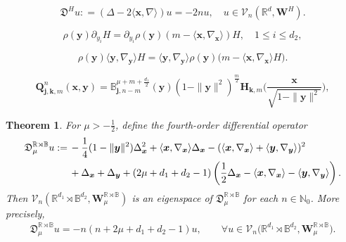 \documentclass[10pt,a4paper]{amsart}
\newtheorem{thm}{Theorem}
\def\BB{{\mathbb B}}
\def\CV{{\mathcal V}}
\def\NN{{\mathbb N}}
\def\RR{{\mathbb R}}
\def\f{\frac}
\def\fD{{\mathfrak D}}
\def\la{{\langle}}
\def\ra{{\rangle}}
\def\xb{{\bm x}}
\def\yb{{\bm y}}
\begin{document}
\begin{equation}\label{eq:diff-eqnH}
   \fD^H u : = ( \Delta - 2 \la \xb, \nabla \ra )u = - 2 n u, 
    \quad u \in \CV_n\left(\RR^d, \bm W^H\right).  
\end{equation}

\begin{equation} \label{eq:diffHa}
  \rho(\yb)  \partial_{y_i} H = \partial_{y_i} \rho(\yb) \left( m  - \la \xb,\nabla_\xb\ra \right) H, \quad 1 \le i\le d_2,
\end{equation}

 \begin{equation} \label{eq:diffHb}
  \rho(\yb)  \la \yb, \nabla_{\yb}\ra  H = \la \yb, \nabla_{\yb}\ra \rho (\yb) \big( m  - \la \xb,\nabla_\xb\ra H \big). 
\end{equation}

 \begin{equation} \label{eq:OP_RB}
 \bm Q_{\bm j, \bm k, m}^n(\bm x,\bm y) = \BB_{\bm j, n-m}^{\mu+m+\frac{d_1}{2}}(\bm y) (1-\|\bm y\|^2)^{\frac{m}{2}}  
      \bm H_{\bm k, m}  \bigg(\frac{\bm x}{\sqrt{1-\|\bm y\|^2}} \bigg),
\end{equation}

\begin{thm}\label{thm:RB}
For $\mu > -\f12$, define the fourth-order differential operator 
\begin{align} \label{eq:RB}
  \fD_{\mu}^{\RR \rtimes \BB} u: = \,& -\frac14 (1-\|\yb\|^2) \Delta_{\xb}^2 + \la \xb,\nabla_\xb\ra \Delta_\xb - (\la \xb,\nabla_\xb\ra 
   + \la \yb,\nabla_\yb\ra) ^2  \\
   & + \Delta_\xb + \Delta_\yb %
   +  (2\mu + d_1+d_2 -1) \left( \f12 \Delta_\xb- \la \xb,\nabla_\xb\ra - \la \yb,\nabla_\yb\ra \right). \notag
\end{align}
Then $\CV_n(\RR^{d_1}  \rtimes \BB^{d_2}, \bm W_{\mu}^{\RR \rtimes \BB})$ is an eigenspace 
of $ \fD_{\mu}^{\RR \rtimes \BB}$ for each $n \in \NN_0$. More precisely, 
\begin{align} \label{eq:RB-eigen}
  \fD_{\mu}^{\RR \rtimes \BB} u =  - n (n+ 2\mu + d_1+d_2 - 1) u, \qquad 
         \forall u \in \CV_n\big(\RR^{d_1}  \rtimes \BB^{d_2}, \bm W_{\mu}^{\RR \rtimes \BB}\big).
\end{align}
\end{thm}
\end{document}
